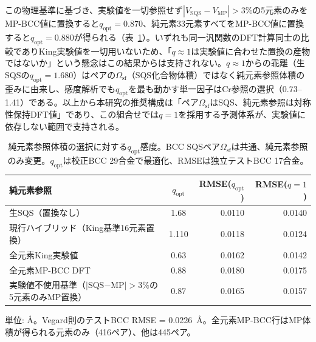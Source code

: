 \documentclass[5p,10pt]{elsarticle}
\begin{document}
この物理基準に基づき、実験値を一切参照せず$|V_\text{SQS} - V_\text{MP}| > 3\%$の5元素のみをMP-BCC値に置換すると$q_\text{opt} = 0.870$、純元素33元素すべてをMP-BCC値に置換すると$q_\text{opt} = 0.880$が得られる（表~\ref{tab:pure_ref_sensitivity}）。いずれも同一汎関数のDFT計算同士の比較でありKing実験値を一切用いないため、「$q \approx 1$は実験値に合わせた置換の産物ではないか」という懸念はこの結果からは支持されない。$q \approx 1$からの乖離（生SQSの$q_\text{opt} = 1.680$）はペアの$\Omega_\text{sf}$（SQS化合物体積）ではなく純元素参照体積の歪みに由来し、感度解析でも$q_\text{opt}$を最も動かす単一因子はCr参照の選択（0.73--1.41）である。以上から本研究の推奨構成は「ペア$\Omega_\text{sf}$はSQS、純元素参照は対称性保持DFT値」であり、この組合せでは$q=1$を採用する予測体系が、実験値に依存しない範囲で支持される。

\begin{table}[H]
\centering
\caption{純元素参照体積の選択に対する$q_\text{opt}$感度。BCC SQSペア$\Omega_\text{sf}$は共通、純元素参照のみ変更。$q_\text{opt}$は校正BCC 29合金で最適化、RMSEは独立テストBCC 17合金。}
\label{tab:pure_ref_sensitivity}
\footnotesize
\begin{tabular}{@{}lcrr@{}}
\toprule
純元素参照 & $q_\text{opt}$ & RMSE($q_\text{opt}$) & RMSE($q\!=\!1$) \\
\midrule
生SQS（置換なし） & 1.68 & 0.0110 & 0.0140 \\
現行ハイブリッド（King基準16元素置換） & 1.110 & 0.0118 & 0.0124 \\
全元素King実験値 & 0.63 & 0.0162 & 0.0142 \\
全元素MP-BCC DFT & 0.88 & 0.0180 & 0.0175 \\
実験値不使用基準（$|$SQS$-$MP$|>3\%$の5元素のみMP置換） & 0.87 & 0.0165 & 0.0157 \\
\bottomrule
\end{tabular}
\par\smallskip
{\scriptsize 単位: \AA。Vegard則のテストBCC RMSE = 0.0226~\AA。全元素MP-BCC行はMP体積が得られる元素のみ（416ペア）、他は445ペア。}
\end{table}
\end{document}
